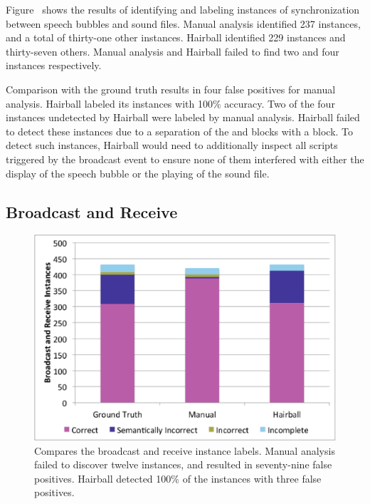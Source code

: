 Figure~ shows the results of identifying and
labeling instances of synchronization between speech bubbles and sound
files. Manual analysis identified 237 \correct{} instances, and a total of
thirty-one other instances. Hairball identified 229 \correct{} instances and
thirty-seven others. Manual analysis and Hairball failed to find two and four
instances respectively.

Comparison with the ground truth results in four false positives for manual
analysis. Hairball labeled its instances with 100\% accuracy. Two of the four
instances undetected by Hairball were labeled \incom{} by manual
analysis. Hairball failed to detect these instances due to a separation of the
\say{} and \playsound{} blocks with a \broadcast{} block. To detect such
instances, Hairball would need to additionally inspect all scripts triggered by
the broadcast event to ensure none of them interfered with either the display
of the speech bubble or the playing of the sound file.

\subsection{Broadcast and Receive}
\begin{figure}[!t]
\centering
\includegraphics[trim=.3in .15in .3in .15in, clip,
  width=5.25in]{graphs/AutoBroadcastReceive.eps}
\caption{Compares the broadcast and receive instance labels. Manual analysis
  failed to discover twelve instances, and resulted in seventy-nine false
  positives. Hairball detected 100\% of the instances with three false
  positives.}
\end{figure}

